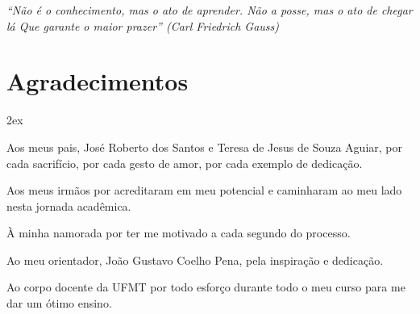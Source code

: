 %
%


\begin{titlepage}

\vspace*{\fill}

\hfill
\begin{minipage}{0.5\linewidth}
\begin{flushright}
\large\it
``Não é o conhecimento, mas o ato de aprender.
Não a posse, mas o ato de chegar lá
Que garante o maior prazer''
(Carl Friedrich Gauss)
\end{flushright}
\end{minipage}

\vspace*{\fill}

\end{titlepage}

\chapter*{Agradecimentos}
\thispagestyle{empty}

\begin{trivlist}  \itemsep 2ex

\item Aos meus pais, José Roberto dos Santos e Teresa de Jesus de Souza Aguiar, por cada sacrifício, por cada gesto de amor, por cada exemplo de dedicação. 

\item Aos meus irmãos por acreditaram em meu potencial e caminharam ao meu lado nesta jornada acadêmica. 

\item À minha namorada por ter me motivado a cada segundo do processo.

\item Ao meu orientador, João Gustavo Coelho Pena, pela inspiração e dedicação.

\item Ao corpo docente da UFMT por todo esforço durante todo o meu curso para me dar um ótimo ensino.

\end{trivlist}
